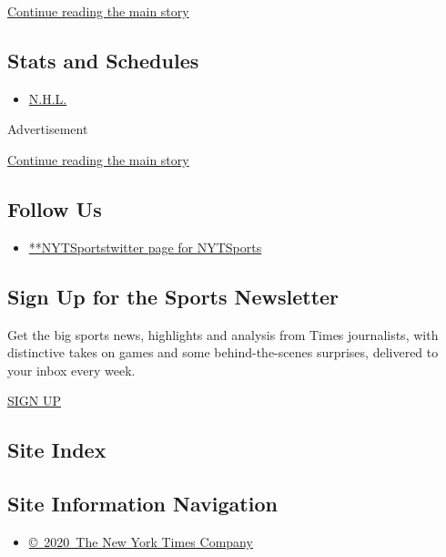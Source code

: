 \protect\hyperlink{after-mid1}{Continue reading the main story}

\hypertarget{stats-and-schedules}{%
\subsection{Stats and Schedules}\label{stats-and-schedules}}

\begin{itemize}
\tightlist
\item
  \protect\hyperlink{}{N.H.L.}
\end{itemize}

Advertisement

\protect\hyperlink{after-mktg}{Continue reading the main story}

\hypertarget{follow-us}{%
\subsection{Follow Us}\label{follow-us}}

\begin{itemize}
\tightlist
\item
  \href{https://twitter.com/NYTSports}{**NYTSportstwitter page for
  NYTSports}
\end{itemize}

\hypertarget{sign-up-for-the-sports-newsletter}{%
\subsection{Sign Up for the Sports
Newsletter}\label{sign-up-for-the-sports-newsletter}}

Get the big sports news, highlights and analysis from Times journalists,
with distinctive takes on games and some behind-the-scenes surprises,
delivered to your inbox every week.

\href{/newsletters/signup/SP}{SIGN UP}

\hypertarget{site-index}{%
\subsection{Site Index}\label{site-index}}

\hypertarget{site-information-navigation}{%
\subsection{Site Information
Navigation}\label{site-information-navigation}}

\begin{itemize}
\tightlist
\item
  \href{https://help.nytimes.com/hc/en-us/articles/115014792127-Copyright-notice}{©~2020~The
  New York Times Company}
\end{itemize}

